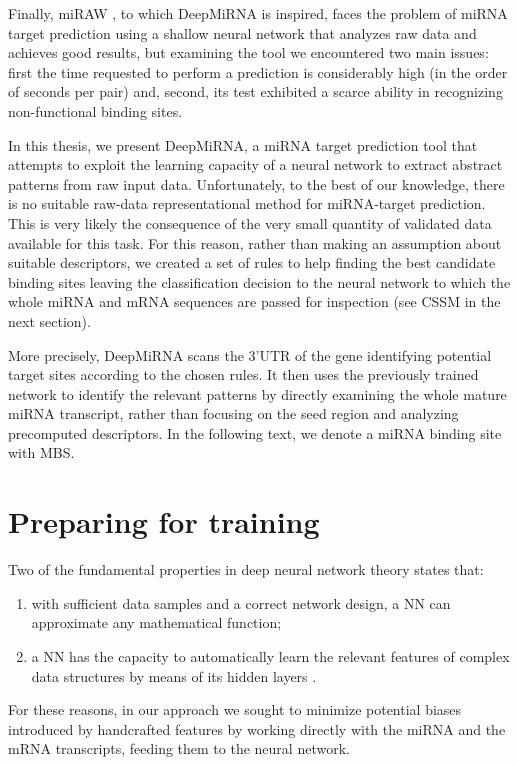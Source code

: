 Finally, miRAW \cite{miraw}, to which DeepMiRNA is inspired, faces the problem of miRNA target prediction using a shallow neural network that analyzes raw data and achieves good results, but examining the tool we encountered two main issues: first the time requested to perform a prediction is considerably high (in the order of seconds per pair) and, second, its test exhibited a scarce ability in recognizing non-functional binding sites.    

In this thesis, we present DeepMiRNA, a miRNA target prediction tool that attempts to exploit the learning capacity of a neural network to extract abstract patterns from raw input data. Unfortunately, to the best of our knowledge, there is no suitable raw-data representational method for miRNA-target prediction. This is very likely the consequence of the very small quantity of validated data available for this task. For this reason, rather than making an assumption about suitable descriptors, we created a set of rules to help finding the best candidate binding sites leaving the classification decision to the neural network to which the whole miRNA and mRNA sequences are passed for inspection (see CSSM in the next section). 

More precisely, DeepMiRNA scans the 3'UTR of the gene identifying potential target sites according to the chosen rules. It then uses the previously trained network to identify the relevant patterns by directly examining the whole mature miRNA transcript, rather than focusing on the seed region and analyzing precomputed descriptors. In the following text, we denote a miRNA binding site with MBS.

\section{Preparing for training}
Two of the fundamental properties in deep neural network theory states that:

\begin{enumerate}
	\item with sufficient data samples and a correct network design, a NN can approximate any mathematical function;
	\item a NN has the capacity to automatically learn the relevant features of complex data structures by means of its hidden layers \cite{dl}.
\end{enumerate}

For these reasons, in our approach we sought to minimize potential biases introduced by handcrafted features by working directly with the miRNA and the mRNA transcripts, feeding them to the neural network.

